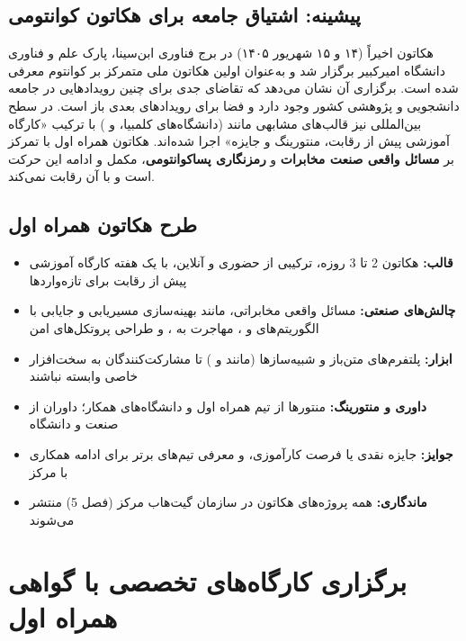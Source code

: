 \documentclass[a4paper,12pt]{article}
\begin{document}
	\subsection{پیشینه: اشتیاق جامعه برای هکاتون کوانتومی}
	هکاتون  اخیراً (۱۴ و ۱۵ شهریور ۱۴۰۵) در برج فناوری ابن‌سینا،
	پارک علم و فناوری دانشگاه امیرکبیر برگزار شد و به‌عنوان اولین هکاتون ملی
	متمرکز بر کوانتوم معرفی شده است. برگزاری آن نشان می‌دهد که تقاضای جدی
	برای چنین رویدادهایی در جامعه دانشجویی و پژوهشی کشور وجود دارد و فضا برای
	رویدادهای بعدی باز است.
	در سطح بین‌المللی نیز قالب‌های مشابهی مانند  (دانشگاه‌های
	کلمبیا،  و ) با ترکیب «کارگاه آموزشی پیش از رقابت،
	منتورینگ و جایزه» اجرا شده‌اند.
	هکاتون همراه اول با تمرکز بر \textbf{مسائل واقعی صنعت مخابرات} و
	\textbf{رمزنگاری پساکوانتومی}، مکمل و ادامه این حرکت است و با آن رقابت نمی‌کند.
	
	\subsection{طرح هکاتون همراه اول}
	\begin{itemize}[rightmargin=0.5cm, itemsep=4pt]
		\item \textbf{قالب:} هکاتون 2 تا 3 روزه، ترکیبی از حضوری و آنلاین، با یک هفته کارگاه آموزشی پیش از رقابت برای تازه‌واردها
		\item \textbf{چالش‌های صنعتی:} مسائل واقعی مخابراتی، مانند بهینه‌سازی مسیریابی و جایابی با الگوریتم‌های  و ، مهاجرت به ، و طراحی پروتکل‌های امن
		\item \textbf{ابزار:} پلتفرم‌های متن‌باز و شبیه‌سازها (مانند  و ) تا مشارکت‌کنندگان به سخت‌افزار خاصی وابسته نباشند
		\item \textbf{داوری و منتورینگ:} منتورها از تیم همراه اول و دانشگاه‌های همکار؛ داوران از صنعت و دانشگاه
		\item \textbf{جوایز:} جایزه نقدی یا فرصت کارآموزی، و معرفی تیم‌های برتر برای ادامه همکاری با مرکز
		\item \textbf{ماندگاری:} همه پروژه‌های هکاتون در سازمان گیت‌هاب مرکز (فصل 5) منتشر می‌شوند
	\end{itemize}

	\section{برگزاری کارگاه‌های تخصصی با گواهی همراه اول}
\end{document}
